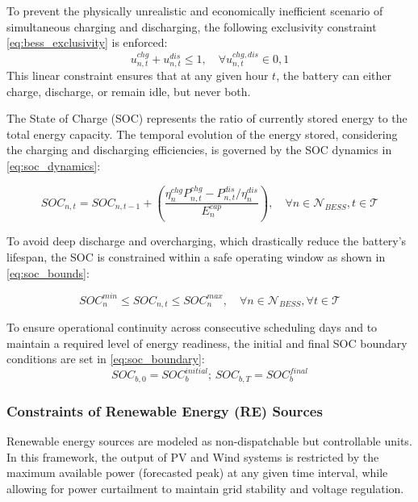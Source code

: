 \documentclass[preprint,12pt]{elsarticle}
\begin{document}
To prevent the physically unrealistic and economically inefficient scenario of simultaneous charging and discharging, the following exclusivity constraint \eqref{eq:bess_exclusivity} is enforced:
\begin{equation}
u_{n,t}^{chg} + u_{n,t}^{dis} \le 1, \quad \forall u_{n,t}^{{chg, dis}} \in {0, 1}
\label{eq:bess_exclusivity}
\end{equation}
This linear constraint ensures that at any given hour $t$, the battery can either charge, discharge, or remain idle, but never both.

The State of Charge (SOC) represents the ratio of currently stored energy to the total energy capacity. The temporal evolution of the energy stored, considering the charging and discharging efficiencies, is governed by the SOC dynamics in \eqref{eq:soc_dynamics}:

\begin{equation}
SOC_{n,t} = SOC_{n,t-1} + \left( \frac{\eta_{n}^{chg} P_{n,t}^{chg} - P_{n,t}^{dis}/\eta_{n}^{dis}}{E_{n}^{cap}} \right), \quad \forall n \in \mathcal{N}_{BESS}, t \in \mathcal{T}
\label{eq:soc_dynamics}
\end{equation}

To avoid deep discharge and overcharging, which drastically reduce the battery's lifespan, the SOC is constrained within a safe operating window as shown in \eqref{eq:soc_bounds}:

\begin{equation}
    SOC_{n}^{min} \le SOC_{n,t} \le SOC_{n}^{max}, \quad \forall n \in \mathcal{N}_{BESS}, \forall t \in \mathcal{T}
    \label{eq:soc_bounds}
\end{equation}

To ensure operational continuity across consecutive scheduling days and to maintain a required level of energy readiness, the initial and final SOC boundary conditions are set in \eqref{eq:soc_boundary}:
\begin{equation}
    SO{C_{b,0}} = SOC_{b}^{initial};\,SO{C_{b,T}} = SOC_{b}^{final} 
    \label{eq:soc_boundary}
\end{equation}
\subsubsection{Constraints of Renewable Energy (RE) Sources}
Renewable energy sources are modeled as non-dispatchable but controllable units. In this framework, the output of PV and Wind systems is restricted by the maximum available power (forecasted peak) at any given time interval, while allowing for power curtailment to maintain grid stability and voltage regulation.
\end{document}
